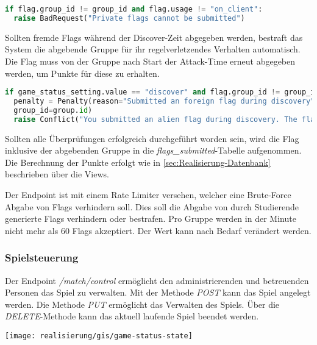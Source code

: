 \begin{lstlisting}[language=Python, frame=single, caption={GIS Abgabe privater Flags verhindern}, captionpos=b, label={lst:gis-prevent-submitting-private-flags}]
if flag.group_id != group_id and flag.usage != "on_client":
  raise BadRequest("Private flags cannot be submitted")
\end{lstlisting}

Sollten fremde Flags während der Discover-Zeit abgegeben werden, bestraft das System die abgebende Gruppe für ihr regelverletzendes Verhalten automatisch. Die Flag muss von der Gruppe nach Start der Attack-Time erneut abgegeben werden, um Punkte für diese zu erhalten.

\begin{lstlisting}[language=Python, frame=single, caption={GIS Strafe für abgeben fremder Flags}, captionpos=b, label={lst:gis-flag-penatly}]
if game_status_setting.value == "discover" and flag.group_id != group_id:
  penalty = Penalty(reason="Submitted an foreign flag during discovery", points=penalty_points,
  group_id=group.id)
  raise Conflict("You submitted an alien flag during discovery. The flag is not accepted. You'll be punished.")
\end{lstlisting}

Sollten alle Überprüfungen erfolgreich durchgeführt worden sein, wird die Flag inklusive der abgebenden Gruppe in die \textit{flags\_submitted}-Tabelle aufgenommen. Die Berechnung der Punkte erfolgt wie in \autoref{sec:Realisierung-Datenbank} beschrieben über die Views.

Der Endpoint ist mit einem Rate Limiter versehen, welcher eine Brute-Force Abgabe von Flags verhindern soll. Dies soll die Abgabe von durch Studierende generierte Flags verhindern oder bestrafen. Pro Gruppe werden in der Minute nicht mehr als 60 Flags akzeptiert. Der Wert kann nach Bedarf verändert werden.

\subsubsection{Spielsteuerung}
Der Endpoint \textit{/match/control} ermöglicht den administrierenden und betreuenden Personen das Spiel zu verwalten. Mit der Methode \textit{POST} kann das Spiel angelegt werden. Die Methode \textit{PUT} ermöglicht das Verwalten des Spiels. Über die \textit{DELETE}-Methode kann das aktuell laufende Spiel beendet werden.

\begin{center}
	\texttt{[image: realisierung/gis/game-status-state]}
	\label{fig:realisierung-gis-game-status}
\end{center}

